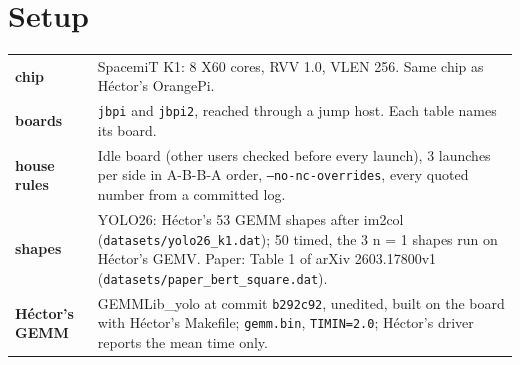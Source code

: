 \section*{Setup}
{\small
\begin{tabularx}{\textwidth}{@{}>{\bfseries}p{2.6cm} X@{}}
\toprule
chip & SpacemiT K1: 8 X60 cores, RVV 1.0, VLEN 256. Same chip as H\'ector's OrangePi. \\
boards & \texttt{jbpi} and \texttt{jbpi2}, reached through a jump host. Each table names its board. \\
house rules & Idle board (other users checked before every launch), 3 launches per side in A-B-B-A order, \texttt{--no-nc-overrides}, every quoted number from a committed log. \\
shapes & YOLO26: H\'ector's 53 GEMM shapes after im2col (\texttt{datasets/yolo26\_k1.dat}); 50 timed, the 3 n = 1 shapes run on H\'ector's GEMV. Paper: Table 1 of arXiv 2603.17800v1 (\texttt{datasets/paper\_bert\_square.dat}). \\
H\'ector's GEMM & GEMMLib\_yolo at commit \texttt{b292c92}, unedited, built on the board with H\'ector's Makefile; \texttt{gemm.bin}, \texttt{TIMIN=2.0}; H\'ector's driver reports the mean time only. \\
\bottomrule
\end{tabularx}}
